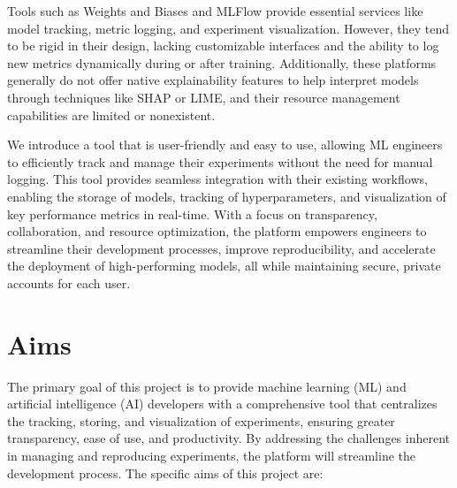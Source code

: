 \documentclass[12pt]{article}
\begin{document}
Tools such as Weights and Biases and MLFlow provide essential services like model tracking, metric logging, and experiment visualization. However, they tend to be rigid in their design, lacking customizable interfaces and the ability to log new metrics dynamically during or after training. Additionally, these platforms generally do not offer native explainability features to help interpret models through techniques like SHAP or LIME, and their resource management capabilities are limited or nonexistent. 

We introduce a tool that is user-friendly and easy to use, allowing ML engineers to efficiently track and manage their experiments without the need for manual logging. This tool provides seamless integration with their existing workflows, enabling the storage of models, tracking of hyperparameters, and visualization of key performance metrics in real-time. With a focus on transparency, collaboration, and resource optimization, the platform empowers engineers to streamline their development processes, improve reproducibility, and accelerate the deployment of high-performing models, all while maintaining secure, private accounts for each user.


\section{Aims}
The primary goal of this project is to provide machine learning (ML) and artificial intelligence (AI) developers with a comprehensive tool that centralizes the tracking, storing, and visualization of experiments, ensuring greater transparency, ease of use, and productivity. By addressing the challenges inherent in managing and reproducing experiments, the platform will streamline the development process. The specific aims of this project are:
\end{document}
